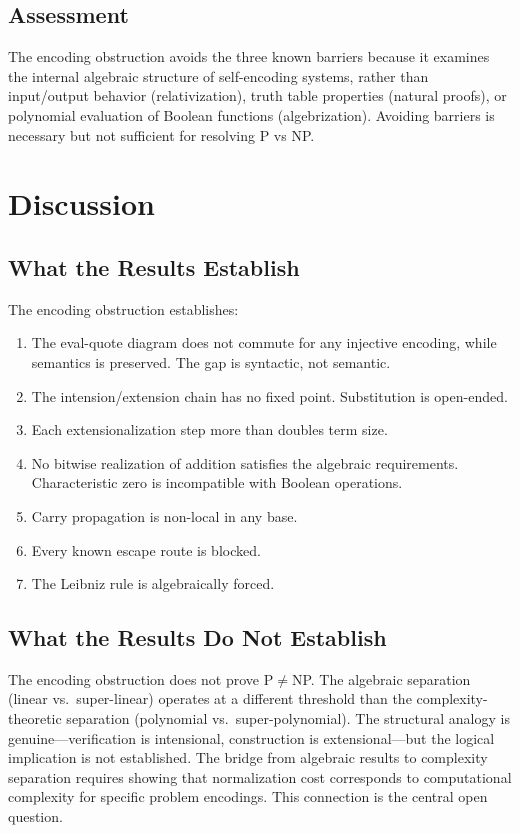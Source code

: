\documentclass[11pt,a4paper]{article}
\theoremstyle{definition}
\theoremstyle{remark}
\begin{document}
\subsection{Assessment}

The encoding obstruction avoids the three known barriers because it examines
the internal algebraic structure of self-encoding systems, rather than
input/output behavior (relativization), truth table properties (natural
proofs), or polynomial evaluation of Boolean functions (algebrization).
Avoiding barriers is necessary but not sufficient for resolving P vs NP.

\section{Discussion}
\label{sec:discussion}

\subsection{What the Results Establish}

The encoding obstruction establishes:
\begin{enumerate}
  \item The eval-quote diagram does not commute for any injective encoding,
    while semantics is preserved. The gap is syntactic, not semantic.
  \item The intension/extension chain has no fixed point.
    Substitution is open-ended.
  \item Each extensionalization step more than doubles term size.
  \item No bitwise realization of addition satisfies the algebraic
    requirements. Characteristic zero is incompatible with Boolean operations.
  \item Carry propagation is non-local in any base.
  \item Every known escape route is blocked.
  \item The Leibniz rule is algebraically forced.
\end{enumerate}

\subsection{What the Results Do Not Establish}

The encoding obstruction does not prove P$\neq$NP. The algebraic separation
(linear vs.\ super-linear) operates at a different threshold than the
complexity-theoretic separation (polynomial vs.\ super-polynomial). The
structural analogy is genuine---verification is intensional, construction is
extensional---but the logical implication is not established. The bridge
from algebraic results to complexity separation requires showing that
normalization cost corresponds to computational complexity for specific
problem encodings. This connection is the central open question.
\end{document}
